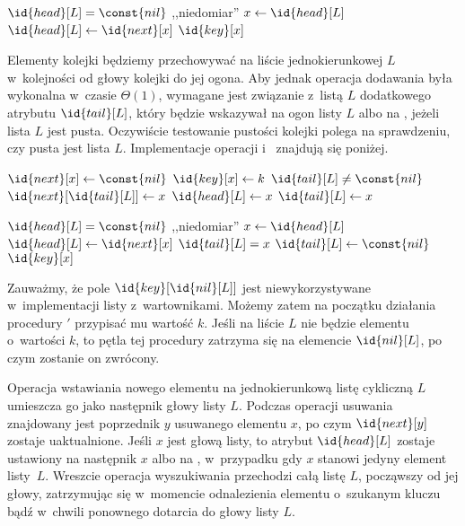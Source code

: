 \begin{codebox}
\li	\If $\id{head}[L]=\const{nil}$
\li		\Then \Error ,,niedomiar''
		\End
\li	$x\gets\id{head}[L]$
\li	$\id{head}[L]\gets\id{next}[x]$
\li	\Return $\id{key}[x]$
\end{codebox}

\exercise %
Elementy kolejki będziemy przechowywać na liście jednokierunkowej $L$ w~kolejności od głowy kolejki do jej ogona. Aby jednak operacja dodawania była wykonalna w~czasie $\Theta(1)$, wymagane jest związanie z~listą $L$ dodatkowego atrybutu $\id{tail}[L]$, który będzie wskazywał na ogon listy $L$ albo na , jeżeli lista $L$ jest pusta. Oczywiście testowanie pustości kolejki polega na sprawdzeniu, czy pusta jest lista $L$. Implementacje operacji  i~ znajdują się poniżej.
\begin{codebox}
\li	$\id{next}[x]\gets\const{nil}$
\li	$\id{key}[x]\gets k$
\li	\If $\id{tail}[L]\ne\const{nil}$
\li		\Then $\id{next}[\id{tail}[L]]\gets x$
\li		\Else $\id{head}[L]\gets x$
		\End
\li	$\id{tail}[L]\gets x$
\end{codebox}

\begin{codebox}
\li	\If $\id{head}[L]=\const{nil}$
\li		\Then \Error ,,niedomiar''
		\End
\li	$x\gets\id{head}[L]$
\li	$\id{head}[L]\gets\id{next}[x]$
\li	\If $\id{tail}[L]=x$
\li		\Then $\id{tail}[L]\gets\const{nil}$
		\End
\li	\Return $\id{key}[x]$
\end{codebox}

\exercise %
Zauważmy, że pole $\id{key}[\id{nil}[L]]$ jest niewykorzystywane w~implementacji listy z~wartownikami. Możemy zatem na początku działania procedury $'$ przypisać mu wartość $k$. Jeśli na liście $L$ nie będzie elementu o~wartości $k$, to pętla tej procedury zatrzyma się na elemencie $\id{nil}[L]$, po czym zostanie on zwrócony.

\exercise %
Operacja wstawiania nowego elementu na jednokierunkową listę cykliczną $L$ umieszcza go jako następnik głowy listy $L$. Podczas operacji usuwania znajdowany jest poprzednik $y$ usuwanego elementu $x$, po czym $\id{next}[y]$ zostaje uaktualnione. Jeśli $x$ jest głową listy, to atrybut $\id{head}[L]$ zostaje ustawiony na następnik $x$ albo na , w~przypadku gdy $x$ stanowi jedyny element listy~$L$. Wreszcie operacja wyszukiwania przechodzi całą listę $L$, począwszy od jej głowy, zatrzymując się w~momencie odnalezienia elementu o~szukanym kluczu bądź w~chwili ponownego dotarcia do głowy listy $L$.

